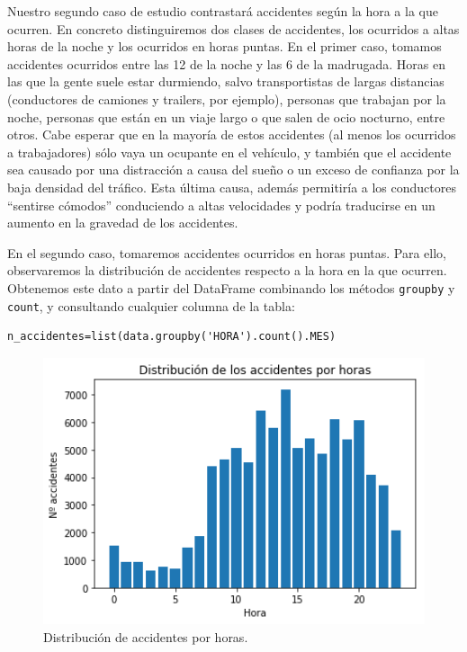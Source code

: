 \documentclass[oneside]{book}
\begin{document}
Nuestro segundo caso de estudio contrastará accidentes según la hora a
la que ocurren. En concreto distinguiremos dos clases de accidentes,
los ocurridos a altas horas de la noche y los ocurridos en horas
puntas. En el primer caso, tomamos accidentes ocurridos entre las 12
de la noche y las 6 de la madrugada. Horas en las que la gente suele
estar durmiendo, salvo transportistas de largas distancias
(conductores de camiones y trailers, por ejemplo), personas que
trabajan por la noche, personas que están en un viaje largo o que
salen de ocio nocturno, entre otros. Cabe esperar que en la mayoría de
estos accidentes (al menos los ocurridos a trabajadores) sólo vaya un
ocupante en el vehículo, y también que el accidente sea causado por
una distracción a causa del sueño o un exceso de confianza por la baja
densidad del tráfico. Esta última causa, además permitiría a los
conductores ``sentirse cómodos'' conduciendo a altas velocidades y
podría traducirse en un aumento en la gravedad de los accidentes.

En el segundo caso, tomaremos accidentes ocurridos en horas
puntas. Para ello, observaremos la distribución de accidentes respecto
a la hora en la que ocurren. Obtenemos este dato a partir del
DataFrame combinando los métodos \texttt{groupby} y \texttt{count}, y
consultando cualquier columna de la tabla:
\begin{verbatim}
n_accidentes=list(data.groupby('HORA').count().MES)
\end{verbatim}

\begin{figure}[H]
  \centering
  \includegraphics[width=120mm]{figures/accidentes/accidentes-hora}
  \caption{Distribución de accidentes por horas.}
  \label{fig:accidentes-hora}
\end{figure}
\end{document}
